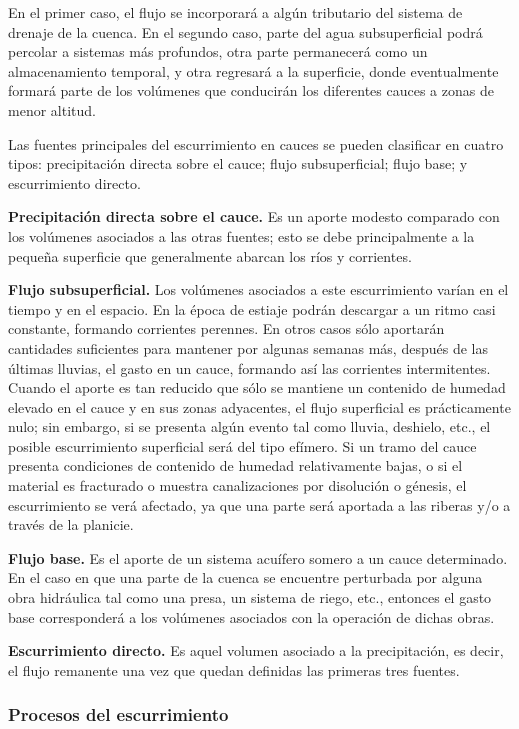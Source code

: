 \documentclass[10pt,a4paper, twoside]{report}
\begin{document}
En el primer caso, el flujo se incorporará a algún tributario del sistema de 
drenaje de la cuenca. En el segundo caso, parte del agua subsuperficial 
podrá percolar a sistemas más profundos, otra parte permanecerá como un 
almacenamiento temporal, y otra regresará a la superficie, donde 
eventualmente formará parte de los volúmenes que conducirán los diferentes 
cauces a zonas de menor altitud. 

Las fuentes principales del escurrimiento en cauces se pueden clasificar en 
cuatro tipos: precipitación directa sobre el cauce; flujo subsuperficial; flujo 
base; y escurrimiento directo.

\textbf{Precipitación directa sobre el cauce.}  Es un aporte modesto comparado 
con los volúmenes asociados a las otras fuentes; esto se debe principalmente 
a la pequeña superficie que generalmente abarcan los ríos y corrientes.

\textbf{Flujo subsuperficial.} Los volúmenes asociados a este escurrimiento varían 
en el tiempo y en el espacio. En la época de estiaje podrán descargar a un 
ritmo casi constante, formando corrientes perennes. En otros casos sólo 
aportarán cantidades suficientes para mantener por algunas semanas más, 
después de las últimas lluvias, el gasto en un cauce, formando así las 
corrientes intermitentes. 
Cuando el aporte es tan reducido que sólo se mantiene un contenido de 
humedad elevado en el cauce y en sus zonas adyacentes, el flujo superficial 
es prácticamente nulo; sin embargo, si se presenta algún evento tal como 
lluvia, deshielo, etc., el posible escurrimiento superficial será del tipo 
efímero. 
Si un tramo del cauce presenta condiciones de contenido de humedad 
relativamente bajas, o si el material es fracturado o muestra canalizaciones 
por disolución o génesis, el escurrimiento se verá afectado, ya que una parte 
será aportada a las riberas y/o a través de la planicie. 

\textbf{Flujo base.} Es el aporte de un sistema acuífero somero a un cauce 
determinado. En el caso en que una parte de la cuenca se encuentre 
perturbada por alguna obra hidráulica tal como una presa, un sistema de 
riego, etc., entonces el gasto base corresponderá a los volúmenes asociados 
con la operación de dichas obras. 


\textbf{Escurrimiento directo.} Es aquel volumen asociado a la precipitación, es 
decir, el flujo remanente una vez que quedan definidas las primeras tres 
fuentes.

\subsubsection{Procesos del escurrimiento}
\label{subsec:procEscurr}
\end{document}
